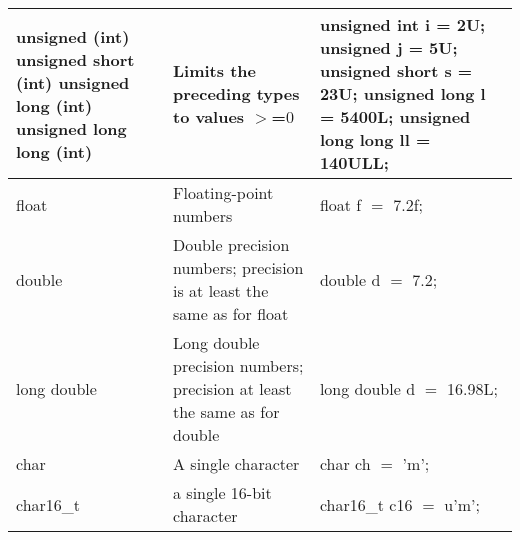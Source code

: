 \documentclass{article}
\begin{document}
\begin{center}
\begin{tabularx}{\textwidth}{
			| >{\raggedright\arraybackslash}X
			| >{\raggedright\arraybackslash}X
			| >{\raggedright\arraybackslash}X |
		}
		\hline
		unsigned (int) \newline unsigned short (int) \newline unsigned long (int) \newline unsigned long long (int) & Limits the preceding types to values $>$=$0$                                                  & unsigned int i = 2U; \newline unsigned j = 5U; \newline unsigned short s = 23U; \newline unsigned long l = 5400L; \newline unsigned long long ll = 140ULL; \\
		\hline
		float                                                                                                       & Floating-point numbers                                                                        & float f $=$ 7.2f;                                                                                                                                          \\
		\hline
		double                                                                                                      & Double precision numbers; precision is at least the same as for float                         & double d $=$ 7.2;                                                                                                                                          \\
		\hline
		long double                                                                                                 & Long double precision numbers; precision at least the same as for double                      & long double d $=$ 16.98L;                                                                                                                                  \\
		\hline
		char                                                                                                        & A single character                                                                            & char ch $=$ 'm';                                                                                                                                           \\
		\hline
		char16\_t                                                                                                   & a single 16-bit character                                                                     & char16\_t c16 $=$ u'm';                                                                                                                                    \\

\end{tabularx}
\end{center}
\end{document}
